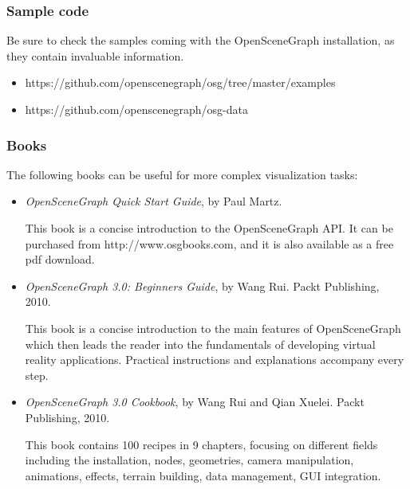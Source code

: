 \subsubsection{Sample code}
\label{sec:graphics:osg-osgearth-samples}

Be sure to check the samples coming with the OpenSceneGraph installation, as
they contain invaluable information.
\begin{itemize}
\item https://github.com/openscenegraph/osg/tree/master/examples
\item https://github.com/openscenegraph/osg-data
\end{itemize}

\subsubsection{Books}
\label{sec:graphics:osg-osgearth-books}

The following books can be useful for more complex visualization tasks:

\begin{itemize}
\item \textit{OpenSceneGraph Quick Start Guide}, by Paul Martz.

This book is a concise introduction to the OpenSceneGraph API. It can be
purchased from http://www.osgbooks.com, and it is also available as
a free pdf download.

\item \textit{OpenSceneGraph 3.0: Beginners Guide}, by Wang Rui. Packt Publishing, 2010.

This book is a concise introduction to the main features of OpenSceneGraph
which then leads the reader into the fundamentals of developing virtual reality
applications. Practical instructions and explanations accompany every step.

\item \textit{OpenSceneGraph 3.0 Cookbook}, by Wang Rui and Qian Xuelei. Packt Publishing, 2010.

This book contains 100 recipes in 9 chapters, focusing on different
fields including the installation, nodes, geometries, camera manipulation,
animations, effects, terrain building, data management, GUI integration.

\end{itemize}


